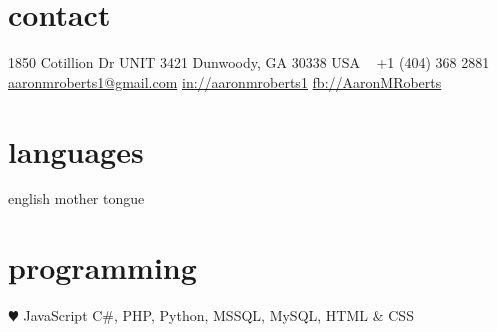 \documentclass[]{friggeri-cv} %
\begin{document}


\begin{aside} %
\section{contact}
1850 Cotillion Dr
UNIT 3421
Dunwoody, GA 30338
USA
~
+1 (404) 368 2881
~
\href{mailto:aaronmroberts1@gmail.com}{aaronmroberts1@gmail.com}
\href{https://www.linkedin.com/in/aaronmroberts1/}{in://aaronmroberts1}
\href{https://www.facebook.com/AaronMRoberts}{fb://AaronMRoberts}
\section{languages}
english mother tongue
\section{programming}
{\color{red} $\varheartsuit$} JavaScript
C\#, PHP, Python, MSSQL, MySQL, HTML \& CSS
\end{aside}

\end{document}
